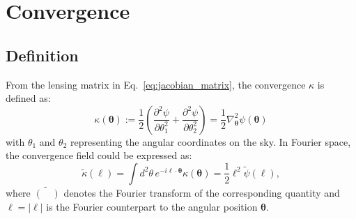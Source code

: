\section{Convergence}
\subsection{Definition}
From the lensing matrix in Eq.~\eqref{eq:jacobian_matrix}, the convergence $\kappa$ is defined as:
\begin{equation}
    \label{eq:convergence}
        \kappa(\boldsymbol{\theta}) := \frac{1}{2} \left( \frac{\partial^2 \psi}{\partial \theta_1^2} + \frac{\partial^2 \psi}{\partial \theta_2^2} \right) = \frac{1}{2} \nabla_{\boldsymbol{\theta}}^2 \psi(\boldsymbol{\theta})
\end{equation}
with $\theta_1$ and $\theta_2$ representing the angular coordinates on the sky.
In Fourier space, the convergence field could be expressed as:
\begin{equation}
    \label{eq:fourier_convergence}
    \tilde{\kappa}(\boldsymbol{\ell}) = \int d^2\theta \, e^{-i\boldsymbol{\ell} \cdot \boldsymbol{\theta}} \kappa(\boldsymbol{\theta}) = \frac{1}{2} \ell^2 \tilde{\psi}(\boldsymbol{\ell}),
\end{equation}
where $\tilde{(\quad)}$ denotes the Fourier transform of the corresponding quantity and $\ell = |\boldsymbol{\ell}|$ is the Fourier counterpart to the angular position $\boldsymbol{\theta}$.
